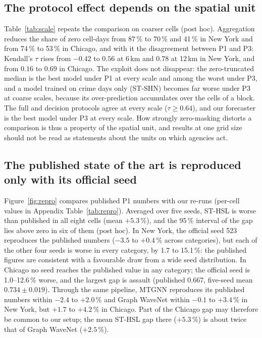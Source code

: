 \documentclass[preprint,12pt,authoryear]{elsarticle}
\begin{document}
\subsection{The protocol effect depends on the spatial unit}\label{sec:res-scale}
Table~\ref{tab:scale} repeats the comparison on coarser cells (post hoc). Aggregation reduces the share of zero cell-days from 87\,\% to 70\,\% and 41\,\% in New York and from 74\,\% to 53\,\% in Chicago, and with it the disagreement between P1 and P3: Kendall's $\tau$ rises from $-0.42$ to $0.56$ at 6\,km and $0.78$ at 12\,km in New York, and from $0.16$ to $0.69$ in Chicago. The exploit does not disappear: the zero-truncated median is the best model under P1 at every scale and among the worst under P3, and a model trained on crime days only (ST-SHN) becomes far worse under P3 at coarse scales, because its over-prediction accumulates over the cells of a block. The full and decision protocols agree at every scale ($\tau\ge0.64$), and our forecaster is the best model under P3 at every scale. How strongly zero-masking distorts a comparison is thus a property of the spatial unit, and results at one grid size should not be read as statements about the units on which agencies act.



\subsection{The published state of the art is reproduced only with its official seed}\label{sec:res-repro}
Figure~\ref{fig:repro} compares published P1 numbers with our re-runs (per-cell values in Appendix Table~\ref{tab:repro}). Averaged over five seeds, ST-HSL is worse than published in all eight cells (mean $+5.3$\,\%), and the 95\,\% interval of the gap lies above zero in six of them (post hoc). In New York, the official seed 523 reproduces the published numbers ($-3.5$ to $+0.4$\,\% across categories), but each of the other four seeds is worse in every category, by 1.7 to 15.1\,\%: the published figures are consistent with a favourable draw from a wide seed distribution. In Chicago no seed reaches the published value in any category; the official seed is 1.0--12.6\,\% worse, and the largest gap is assault (published 0.667, five-seed mean $0.734\pm0.019$). Through the same pipeline, MTGNN reproduces its published numbers within $-2.4$ to $+2.0$\,\% and Graph WaveNet within $-0.1$ to $+3.4$\,\% in New York, but $+1.7$ to $+4.2$\,\% in Chicago. Part of the Chicago gap may therefore be common to our setup; the mean ST-HSL gap there ($+5.3$\,\%) is about twice that of Graph WaveNet ($+2.5$\,\%).
\end{document}
